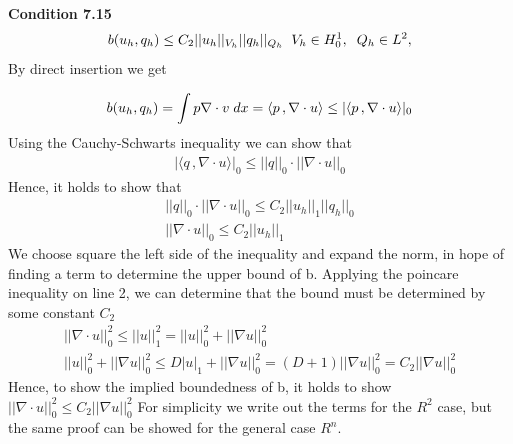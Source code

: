 \documentclass[a4paper,norsk]{article}
\begin{document}
\textbf{Condition 7.15}
\begin{align*}
b(u_h, q_h) \leq C_2 ||u_h||_{V_h} ||q_h||_{Q_h} \hspace{2mm}  V_h \in H_0^1, \hspace{2mm} Q_h \in L^2,
\end{align*}
By direct insertion we get

\begin{align*}
b(u_h, q_h) = \int p \nabla \cdot v \hspace{1mm} dx = \langle p \,, \nabla \cdot u \rangle \leq | \langle p \,, \nabla \cdot u \rangle |_0
\end{align*}
Using the Cauchy-Schwarts inequality we can show that
\begin{align*}
| \langle q \,, \nabla \cdot u \rangle |_0 \leq ||q||_0 \cdot ||\nabla \cdot u||_0
\end{align*}
Hence, it holds to show that
\begin{align*}
  ||q||_0 \cdot ||\nabla \cdot u||_0 \leq C_2 ||u_h||_{1} ||q_h||_{0} \\
  ||\nabla \cdot u||_0 \leq C_2 ||u_h||_{1}
\end{align*}
We choose square the left side of the inequality and expand the norm, in hope of finding a term to
determine the upper bound of b. Applying the poincare inequality on line 2, we can determine that the bound must be
determined by some constant $C_2$
\begin{align*}
||\nabla \cdot u||_0^2 \leq ||u||_1^2 = ||u||_0^2 + ||\nabla u ||_0^2 \\
||u||_0^2 + ||\nabla u ||_0^2 \leq D |u|_1 + ||\nabla u||_0^2 = (D + 1)||\nabla u ||_0^2 = C_2||\nabla u ||_0^2
\end{align*}
Hence, to show the implied boundedness of b, it holds to show $||\nabla \cdot u||_0^2 \leq C_2||\nabla u ||_0^2$
For simplicity we write out the terms for the $R^2$ case, but the same proof can be showed for the general case $R^n$.
\end{document}

